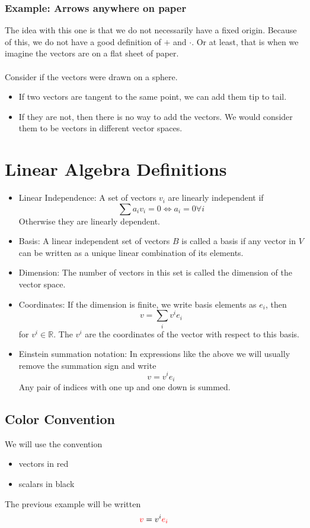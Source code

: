 \documentclass[10pt]{article}
\newcommand{\R}{\mathbb{R}}
\begin{document}
\subsubsection*{Example: Arrows anywhere on paper}
The idea with this one is that we do not necessarily have a fixed origin.  Because of this, we do not have a good definition of $+$ and $\cdot$.  Or at least, that is when we imagine the vectors are on a flat sheet of paper.\\\\
Consider if the vectors were drawn on a sphere.  
\begin{itemize}
    \item If two vectors are tangent to the same point, we can add them tip to tail.
    \item If they are not, then there is no way to add the vectors.  We would consider them to be vectors in different vector spaces.
\end{itemize}
\section*{Linear Algebra Definitions}
\begin{itemize}
    \item Linear Independence: A set of vectors $v_i$ are linearly independent if 
    \[\sum a_i v_i = 0 \Longleftrightarrow a_i = 0 \forall i\] 
    Otherwise they are linearly dependent.
    \item Basis: A linear independent set of vectors $B$ is called a basis if any vector in $V$ can be written as a unique linear combination of its elements.
    \item Dimension: The number of vectors in this set is called the dimension of the vector space.
    \item Coordinates: If the dimension is finite, we write basis elements as $e_i$, then 
    \[v = \sum_i v^i e_i\]
    for $v^i \in \R$.  The $v^i$ are the coordinates of the vector with respect to this basis.
    \item Einstein summation notation: In expressions like the above we will usually remove the summation sign and write
    \[v = v^i e_i\]
    Any pair of indices with one up and one down is summed.
\end{itemize}
\subsection*{Color Convention}
We will use the convention
\begin{itemize}
    \item vectors in red
    \item scalars in black
\end{itemize}
The previous example will be written
\[\textcolor{red}{v} = v^i \textcolor{red}{e_i}\]
\end{document}

